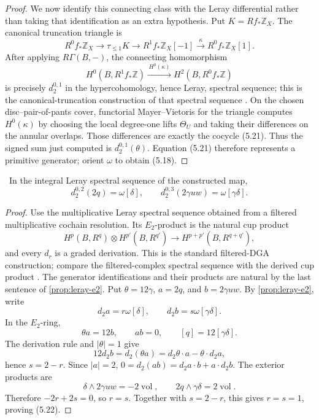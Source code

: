 \begin{proof}
We now identify this connecting class with the Leray differential rather
than taking that identification as an extra hypothesis.  Put
\(K=Rf_*\mathbb Z_X\).  The canonical truncation triangle
\cite[Tag~08J5]{StacksProject} is
\[
 R^0f_*\mathbb Z_X\longrightarrow\tau_{\le1}K
 \longrightarrow R^1f_*\mathbb Z_X[-1]
 \xrightarrow{\ \kappa\ }R^0f_*\mathbb Z_X[1].
\tag{5.21a}
\]
After applying \(R\Gamma(B,-)\), the connecting homomorphism
\[
 H^0(B,R^1f_*\mathbb Z)\xrightarrow{\,H^0(\kappa)\,}
 H^2(B,R^0f_*\mathbb Z)
\tag{5.21b}
\]
is precisely \(d_2^{0,1}\) in the hypercohomology, hence Leray, spectral
sequence; this is the canonical-truncation construction of that spectral
sequence \cite[Tag~0FLJ]{StacksProject}.  On the chosen disc--pair-of-pants
cover, functorial Mayer--Vietoris for the triangle
\cite[Tag~0F16]{StacksProject} computes \(H^0(\kappa)\) by choosing the local
degree-one lifts \(\Theta_U\) and taking their differences on the annular
overlaps.  Those differences are exactly the cocycle (5.21).  Thus the
signed sum just computed is \(d_2^{0,1}(\theta)\).
Equation (5.21) therefore represents a primitive generator; orient \(\omega\)
to obtain (5.18).
\end{proof}

\begin{lemma}
\label{lem:higher-transgressions}
\Verified\ In the integral Leray spectral sequence of the constructed map,
\[
 d_2^{0,2}(2q)=\omega[\delta],
 \qquad
 d_2^{0,3}(2\gamma uw)=\omega[\gamma\delta].
\tag{5.22}
\]
\end{lemma}

\begin{proof}
Use the multiplicative Leray spectral sequence obtained from a filtered
multiplicative cochain resolution.  Its \(E_2\)-product is the natural cup
product
\[
 H^p(B,R^q)\otimes H^{p'}(B,R^{q'})
 \longrightarrow H^{p+p'}(B,R^{q+q'}),
\]
and every \(d_r\) is a graded derivation.  This is the standard filtered-DGA
construction; compare the filtered-complex spectral sequence
\cite[Tags~012K and~0FLJ]{StacksProject} with the derived cup product
\cite[\S20.31]{StacksProject}.  The generator identifications and their
products are natural by the last sentence of
\cref{prop:leray-e2}.
Put \(\theta=12\gamma\), \(a=2q\), and \(b=2\gamma uw\).  By
\cref{prop:leray-e2}, write
\[
 d_2a=r\omega[\delta],\qquad d_2b=s\omega[\gamma\delta].
\]
In the \(E_2\)-ring,
\[
 \theta a=12b,\qquad ab=0,\qquad [q]=12[\gamma\delta].
\]
The derivation rule and \(|\theta|=1\) give
\[
12d_2b=d_2(\theta a)=d_2\theta\cdot a-\theta\cdot d_2a,
\]
hence \(s=2-r\).  Since \(|a|=2\),
\(0=d_2(ab)=d_2a\cdot b+a\cdot d_2b\).  The exterior products are
\[
 \delta\wedge2\gamma uw=-2\operatorname{vol},
 \qquad
 2q\wedge\gamma\delta=2\operatorname{vol}.
\]
Therefore \(-2r+2s=0\), so \(r=s\).  Together with \(s=2-r\), this gives
\(r=s=1\), proving (5.22).
\end{proof}

